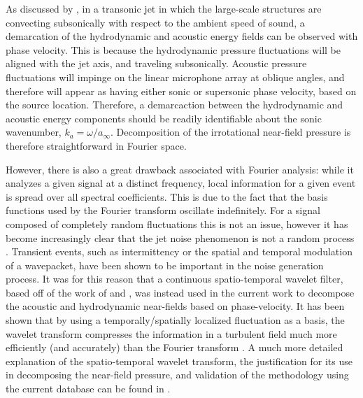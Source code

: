 As discussed by \citet{Tinney2008}, in a transonic jet in which the large-scale structures are convecting subsonically with respect to the ambient speed of sound, a demarcation of the hydrodynamic and acoustic energy fields can be observed with phase velocity.
This is because the hydrodynamic pressure fluctuations will be aligned with the jet axis, and traveling subsonically. 
Acoustic pressure fluctuations will impinge on the linear microphone array at oblique angles, and therefore will appear as having either sonic or supersonic phase velocity, based on the source location. 
Therefore, a demarcaction between the hydrodynamic and acoustic energy components should be readily identifiable about the sonic wavenumber, $k_a = \omega / a_\infty$.
Decomposition of the irrotational near-field pressure is therefore straightforward in Fourier space.

However, there is also a great drawback associated with Fourier analysis: while it analyzes a given signal at a distinct frequency, local information for a given event is spread over all spectral coefficients. 
This is due to the fact that the basis functions used by the Fourier transform oscillate indefinitely. 
For a signal composed of completely random fluctuations this is not an issue, however it has become increasingly clear that the jet noise phenomenon is not a random process \citep{Kearney-Fischer2013}.
Transient events, such as intermittency or the spatial and temporal modulation of a wavepacket, have been shown to be important in the noise generation process. 
It was for this reason that a continuous spatio-temporal wavelet filter, based off of the work of \cite{Antoine2004} and \cite{Kikuchi2010}, was instead used in the current work to decompose the acoustic and hydrodynamic near-fields based on phase-velocity.
It has been shown that by using a temporally/spatially localized fluctuation as a basis, the wavelet transform compresses the information in a turbulent field much more efficiently (and accurately) than the Fourier transform \citep{Farge1992}.
A much more detailed explanation of the spatio-temporal wavelet transform, the justification for its use in decomposing the near-field pressure, and validation of the methodology using the current database can be found in \citet{Crawley2016}. 

